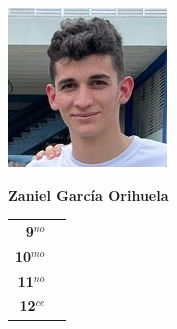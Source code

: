 \begin{minipage}{0.2\textwidth}
	\includegraphics[width=\linewidth]{img/concursantes/zaniel.png} %
\end{minipage}
\hfill
\begin{minipage}{0.7\textwidth}
	\textbf{Zaniel García Orihuela}
	
	\vspace*{0.1in}
	\begin{tabular}{rl}
		
		\textbf{9$^{no}$} &  \\
		
		\textbf{10$^{mo}$} &   \\
		
		\textbf{11$^{no}$} &  \\
		
		\textbf{12$^{ce}$} &   \\
		
		
	\end{tabular}
\end{minipage}

